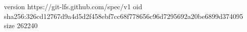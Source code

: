 version https://git-lfs.github.com/spec/v1
oid sha256:326cd12767d9a4d5d2f458ebf7cc68f778656c96d7295692a20be6899d374095
size 262240
